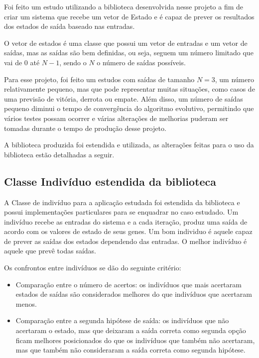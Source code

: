 Foi feito um estudo utilizando a biblioteca desenvolvida nesse projeto a fim de criar um sistema que recebe um vetor de Estado e é capaz de prever os resultados dos estados de saída baseado nas entradas.

O vetor de estados é uma classe que possui um vetor de entradas e um vetor de saídas, mas as saídas são bem definidas, ou seja, seguem um número limitado que vai de 0 até $N-1$, sendo o $N$ o número de saídas possíveis.

Para esse projeto, foi feito um estudos com saídas de tamanho $N=3$, um número relativamente pequeno, mas que pode representar muitas situações, como casos de uma previsão de vitória, derrota ou empate. Além disso, um número de saídas pequeno diminui o tempo de convergência do algoritmo evolutivo, permitindo que vários testes possam ocorrer e várias alterações de melhorias puderam ser tomadas durante o tempo de produção desse projeto.

A biblioteca produzida foi estendida e utilizada, as alterações feitas para o uso da biblioteca estão detalhadas a seguir.

\subsection{Classe Indivíduo estendida da biblioteca}

A Classe de indivíduo para a aplicação estudada foi estendida da biblioteca e possui implementações particulares para se enquadrar no caso estudado. Um indivíduo recebe as entradas do sistema e a cada iteração, produz uma saída de acordo com os valores de estado de seus genes. Um bom individuo é aquele capaz de prever as saídas dos estados dependendo das entradas. O melhor indivíduo é aquele que prevê todas saídas.

Os confrontos entre indivíduos se dão do seguinte critério:
\begin{itemize}
    \item Comparação entre o número de acertos: os indivíduos que mais acertaram estados de saídas são considerados melhores do que indivíduos que acertaram menos.
    \item Comparação entre a segunda hipótese de saída: os indivíduos que não acertaram o estado, mas que deixaram a saída correta como segunda opção ficam melhores posicionados do que os indivíduos que também não acertaram, mas que também não consideraram a saída correta como segunda hipótese.
\end{itemize}

